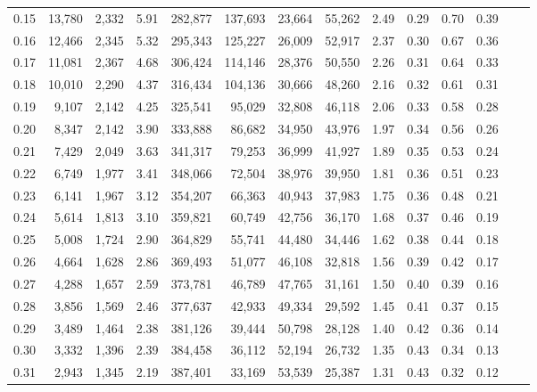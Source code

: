 \begin{tabular}{rrrrrrrrrrrrrr}
0.15 &  13,780 &  2,332 &    5.91 &  282,877 &  137,693 &  23,664 &  55,262 &  2.49 &  0.29 &  0.70 &      0.39 \\
0.16 &  12,466 &  2,345 &    5.32 &  295,343 &  125,227 &  26,009 &  52,917 &  2.37 &  0.30 &  0.67 &      0.36 \\
0.17 &  11,081 &  2,367 &    4.68 &  306,424 &  114,146 &  28,376 &  50,550 &  2.26 &  0.31 &  0.64 &      0.33 \\
0.18 &  10,010 &  2,290 &    4.37 &  316,434 &  104,136 &  30,666 &  48,260 &  2.16 &  0.32 &  0.61 &      0.31 \\
0.19 &   9,107 &  2,142 &    4.25 &  325,541 &   95,029 &  32,808 &  46,118 &  2.06 &  0.33 &  0.58 &      0.28 \\
0.20 &   8,347 &  2,142 &    3.90 &  333,888 &   86,682 &  34,950 &  43,976 &  1.97 &  0.34 &  0.56 &      0.26 \\
0.21 &   7,429 &  2,049 &    3.63 &  341,317 &   79,253 &  36,999 &  41,927 &  1.89 &  0.35 &  0.53 &      0.24 \\
0.22 &   6,749 &  1,977 &    3.41 &  348,066 &   72,504 &  38,976 &  39,950 &  1.81 &  0.36 &  0.51 &      0.23 \\
0.23 &   6,141 &  1,967 &    3.12 &  354,207 &   66,363 &  40,943 &  37,983 &  1.75 &  0.36 &  0.48 &      0.21 \\
0.24 &   5,614 &  1,813 &    3.10 &  359,821 &   60,749 &  42,756 &  36,170 &  1.68 &  0.37 &  0.46 &      0.19 \\
0.25 &   5,008 &  1,724 &    2.90 &  364,829 &   55,741 &  44,480 &  34,446 &  1.62 &  0.38 &  0.44 &      0.18 \\
0.26 &   4,664 &  1,628 &    2.86 &  369,493 &   51,077 &  46,108 &  32,818 &  1.56 &  0.39 &  0.42 &      0.17 \\
0.27 &   4,288 &  1,657 &    2.59 &  373,781 &   46,789 &  47,765 &  31,161 &  1.50 &  0.40 &  0.39 &      0.16 \\
0.28 &   3,856 &  1,569 &    2.46 &  377,637 &   42,933 &  49,334 &  29,592 &  1.45 &  0.41 &  0.37 &      0.15 \\
0.29 &   3,489 &  1,464 &    2.38 &  381,126 &   39,444 &  50,798 &  28,128 &  1.40 &  0.42 &  0.36 &      0.14 \\
0.30 &   3,332 &  1,396 &    2.39 &  384,458 &   36,112 &  52,194 &  26,732 &  1.35 &  0.43 &  0.34 &      0.13 \\
0.31 &   2,943 &  1,345 &    2.19 &  387,401 &   33,169 &  53,539 &  25,387 &  1.31 &  0.43 &  0.32 &      0.12 \\

\end{tabular}
